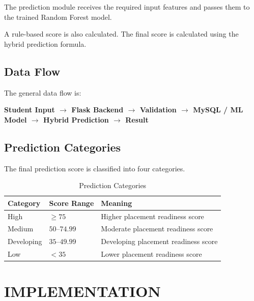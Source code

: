 \documentclass[12pt,a4paper]{report}
\begin{document}
The prediction module receives the required input features and
passes them to the trained Random Forest model.

A rule-based score is also calculated. The final score is
calculated using the hybrid prediction formula.

\section{Data Flow}

The general data flow is:

\begin{center}
\textbf{
Student Input
$\rightarrow$
Flask Backend
$\rightarrow$
Validation
$\rightarrow$
MySQL / ML Model
$\rightarrow$
Hybrid Prediction
$\rightarrow$
Result
}
\end{center}

\section{Prediction Categories}

The final prediction score is classified into four categories.

\begin{table}[H]
\centering
\caption{Prediction Categories}

\begin{tabular}{p{}
                p{}
                p{}}
\toprule
\textbf{Category} & \textbf{Score Range} & \textbf{Meaning} \\
\midrule
High & $\geq 75$ & Higher placement readiness score \\
Medium & $50$--$74.99$ & Moderate placement readiness score \\
Developing & $35$--$49.99$ & Developing placement readiness score \\
Low & $<35$ & Lower placement readiness score \\
\bottomrule
\end{tabular}
\end{table}


\chapter{IMPLEMENTATION}
\end{document}
